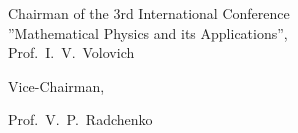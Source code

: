 \begin{flushright} \it \footnotesize

Chairman of the 3rd International Conference \\

''Mathematical Physics and its Applications'', \\

Prof.~I.~V.~Volovich

 \end{flushright}

 

 

 

\begin{flushright} \it \footnotesize

Vice-Chairman,

Prof.~V.~P.~Radchenko

 \end{flushright}



\vspace{-3mm}



\newpage



\Russian



%

%

%


